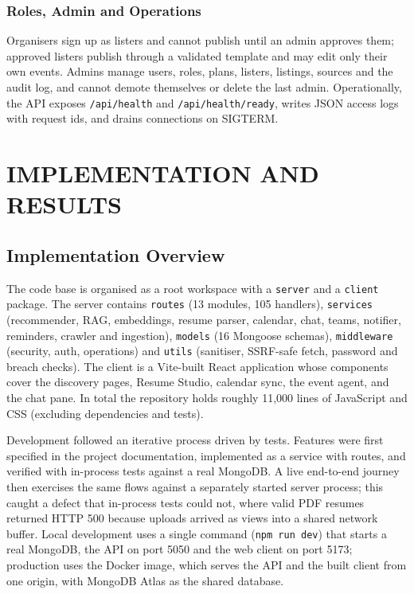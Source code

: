 \documentclass[12pt,a4paper]{report}
\begin{document}
\subsection{Roles, Admin and Operations}
Organisers sign up as listers and cannot publish until an admin approves them; approved listers publish through a validated template and may edit only their own events. Admins manage users, roles, plans, listers, listings, sources and the audit log, and cannot demote themselves or delete the last admin. Operationally, the API exposes \texttt{/api/health} and \texttt{/api/health/ready}, writes JSON access logs with request ids, and drains connections on SIGTERM.

\chapter{IMPLEMENTATION AND RESULTS}

\section{Implementation Overview}
The code base is organised as a root workspace with a \texttt{server} and a \texttt{client} package. The server contains \texttt{routes} (13 modules, 105 handlers), \texttt{services} (recommender, RAG, embeddings, resume parser, calendar, chat, teams, notifier, reminders, crawler and ingestion), \texttt{models} (16 Mongoose schemas), \texttt{middleware} (security, auth, operations) and \texttt{utils} (sanitiser, SSRF-safe fetch, password and breach checks). The client is a Vite-built React application whose components cover the discovery pages, Resume Studio, calendar sync, the event agent, and the chat pane. In total the repository holds roughly 11,000 lines of JavaScript and CSS (excluding dependencies and tests).

Development followed an iterative process driven by tests. Features were first specified in the project documentation, implemented as a service with routes, and verified with in-process tests against a real MongoDB. A live end-to-end journey then exercises the same flows against a separately started server process; this caught a defect that in-process tests could not, where valid PDF resumes returned HTTP 500 because uploads arrived as views into a shared network buffer. Local development uses a single command (\texttt{npm run dev}) that starts a real MongoDB, the API on port 5050 and the web client on port 5173; production uses the Docker image, which serves the API and the built client from one origin, with MongoDB Atlas as the shared database.
\end{document}
